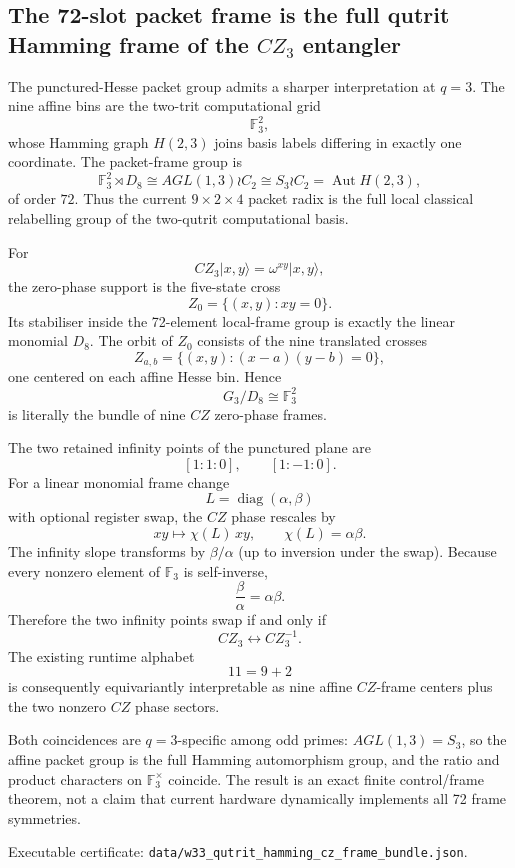 \subsection{The 72-slot packet frame is the full qutrit Hamming frame of the \(CZ_3\) entangler}
\label{sec:20260919-qutrit-hamming-cz-frame}

The punctured-Hesse packet group admits a sharper interpretation at \(q=3\).
The nine affine bins are the two-trit computational grid
\[
\mathbb F_3^2,
\]
whose Hamming graph \(H(2,3)\) joins basis labels differing in exactly one
coordinate.  The packet-frame group is
\[
\mathbb F_3^2\rtimes D_8
\cong AGL(1,3)\wr C_2
\cong S_3\wr C_2
=\operatorname{Aut}H(2,3),
\]
of order \(72\).  Thus the current \(9\times2\times4\) packet radix is the
full local classical relabelling group of the two-qutrit computational basis.

For
\[
CZ_3|x,y\rangle=\omega^{xy}|x,y\rangle,
\]
the zero-phase support is the five-state cross
\[
Z_0=\{(x,y):xy=0\}.
\]
Its stabiliser inside the 72-element local-frame group is exactly the linear
monomial \(D_8\).  The orbit of \(Z_0\) consists of the nine translated crosses
\[
Z_{a,b}=\{(x,y):(x-a)(y-b)=0\},
\]
one centered on each affine Hesse bin.  Hence
\[
G_3/D_8\cong\mathbb F_3^2
\]
is literally the bundle of nine \(CZ\) zero-phase frames.

The two retained infinity points of the punctured plane are
\[
[1:1:0],\qquad [1:-1:0].
\]
For a linear monomial frame change
\[
L=\operatorname{diag}(\alpha,\beta)
\]
with optional register swap, the \(CZ\) phase rescales by
\[
xy\longmapsto \chi(L)\,xy,\qquad \chi(L)=\alpha\beta.
\]
The infinity slope transforms by \(\beta/\alpha\) (up to inversion under the
swap).  Because every nonzero element of \(\mathbb F_3\) is self-inverse,
\[
\frac{\beta}{\alpha}=\alpha\beta.
\]
Therefore the two infinity points swap if and only if
\[
CZ_3\longleftrightarrow CZ_3^{-1}.
\]
The existing runtime alphabet
\[
11=9+2
\]
is consequently equivariantly interpretable as nine affine \(CZ\)-frame
centers plus the two nonzero \(CZ\) phase sectors.

Both coincidences are \(q=3\)-specific among odd primes: \(AGL(1,3)=S_3\), so
the affine packet group is the full Hamming automorphism group, and the ratio
and product characters on \(\mathbb F_3^\times\) coincide.  The result is an
exact finite control/frame theorem, not a claim that current hardware
dynamically implements all 72 frame symmetries.

Executable certificate:
\texttt{data/w33\_qutrit\_hamming\_cz\_frame\_bundle.json}.
